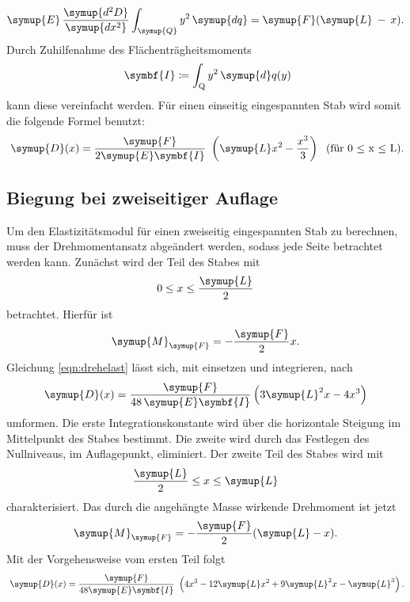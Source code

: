 \begin{equation}
  \symup{E} \, \frac{\symup{d^2 D}}{\symup{dx^2}}
  \int_{\symup{Q}} y^2 \, \symup{dq}
  = \symup{F}(\symup{L} \: - \: x).
  \label{eqn:drehelast}
\end{equation}
Durch Zuhilfenahme des Flächenträgheitsmoments
\begin{equation}
   \symbf{I} \coloneq \int_{\text{Q}} y^2 \, \symup{d}q(y)
\end{equation}
\label{eqn:flaechentraegheit}
kann diese vereinfacht werden. Für einen
einseitig eingespannten Stab wird somit die folgende Formel benutzt:
\begin{equation}
   \symup{D}(x) = \frac{\symup{F}}{2\symup{E} \symbf{I}}
   \left(\symup{L}x^2 - \frac{x^3}{3} \right)
   \text{\; (für 0 $\leq$ x $\leq$ L).}
   \label{eqn:auflage1seite}
\end{equation}

\subsection{Biegung bei zweiseitiger Auflage}
Um den Elastizitätsmodul für einen zweiseitig eingespannten
Stab zu berechnen, muss der Drehmomentansatz abgeändert werden, sodass
jede Seite betrachtet werden kann.
Zunächst wird der Teil des Stabes mit
\begin{equation*}
  0 \leq x \leq \frac{\symup{L}}{2}
\end{equation*}
betrachtet. Hierfür ist
\begin{equation}
  \symup{M}_{\symup{F}} = - \frac{\symup{F}}{2} x.
\end{equation}
Gleichung \eqref{eqn:drehelast} lässt sich, mit einsetzen und integrieren, nach
\begin{equation}
  \symup{D}(x) = \frac{\symup{F}}
  {48 \, \symup{E} \symbf{I}}
  \left( 3 \symup{L}^2 x - 4 x^3 \right)
  \label{eqn:auflage2seiterechts}
\end{equation}
umformen. Die erste Integrationskonstante wird über die horizontale Steigung
im Mittelpunkt des Stabes bestimmt.
Die zweite wird durch das Festlegen des Nullniveaus,
im Auflagepunkt, eliminiert. Der zweite Teil des Stabes wird mit
\begin{equation*}
  \frac{\symup{L}}{2} \leq x \leq \symup{L}
\end{equation*}
charakterisiert. Das durch die angehängte Masse wirkende Drehmoment ist jetzt
\begin{equation}
  \symup{M}_{\symup{F}} = - \frac{\symup{F}}{2} (\symup{L} - x).
\end{equation}
Mit der Vorgehensweise vom ersten Teil folgt
\begin{equation}
   \symup{D}(x) = \frac{\symup{F}}{48\symup{E}\symbf{I}}
   \left(4x^3 - 12\symup{L}x^2 + 9\symup{L}^2 x - \symup{L}^3\right).
   \label{eqn:auflage2seitelinks}
\end{equation}
